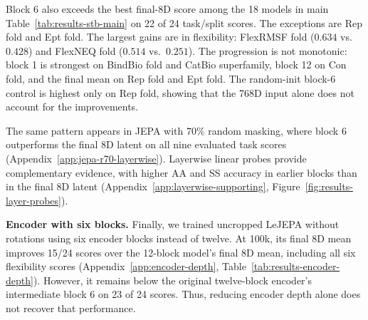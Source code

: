 Block 6 also exceeds the best final-8D score among the 18 models in main Table~\ref{tab:results-stb-main} on 22 of 24 task/split scores. The exceptions are Rep fold and Ept fold.
The largest gains are in flexibility: FlexRMSF fold ($0.634$ vs.\ $0.428$) and FlexNEQ fold ($0.514$ vs.\ $0.251$).
The progression is not monotonic: block 1 is strongest on BindBio fold and CatBio superfamily, block 12 on Con fold, and the final mean on Rep fold and Ept fold.
The random-init block-6 control is highest only on Rep fold, showing that the 768D input alone does not account for the improvements.

The same pattern appears in JEPA with 70\% random masking, where block 6 outperforms the final 8D latent on all nine evaluated task scores (Appendix~\ref{app:jepa-r70-layerwise}). Layerwise linear probes provide complementary evidence, with higher AA and SS accuracy in earlier blocks than in the final 8D latent (Appendix~\ref{app:layerwise-supporting}, Figure~\ref{fig:results-layer-probes}).

{\textbf{Encoder with six blocks.} Finally, we trained uncropped LeJEPA without rotations using six encoder blocks instead of twelve.
At 100k, its final 8D mean improves 15/24 scores over the 12-block model's final 8D mean, including all six flexibility scores (Appendix~\ref{app:encoder-depth}, Table~\ref{tab:results-encoder-depth}).
However, it remains below the original twelve-block encoder's intermediate block 6 on 23 of 24 scores. Thus, reducing encoder depth alone does not recover that performance.}


\clearpage

